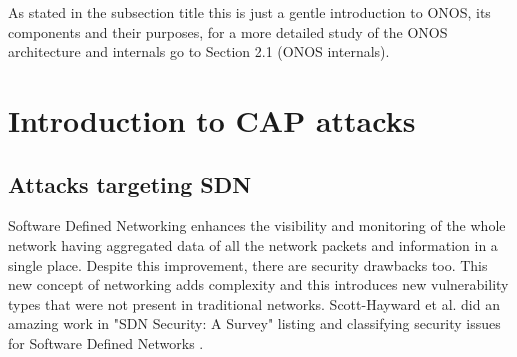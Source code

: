 \documentclass[a4paper,10pt]{memoir}
\begin{document}
As stated in the subsection title this is just a gentle introduction to ONOS, its components and their purposes, for a more detailed study of the ONOS architecture and internals go to Section 2.1 (ONOS internals).  

\clearpage

\section{Introduction to CAP attacks}

\subsection{Attacks targeting SDN}

Software Defined Networking enhances the visibility and monitoring of the whole network having aggregated data of all the network packets and information in a single place. Despite this improvement, there are security drawbacks too. This new concept of networking adds complexity and this introduces new vulnerability types that were not present in traditional networks. Scott-Hayward et al. did an amazing work in "SDN Security: A Survey" listing and classifying security issues for Software Defined Networks \cite{sdn-security-survey}.
\end{document}
